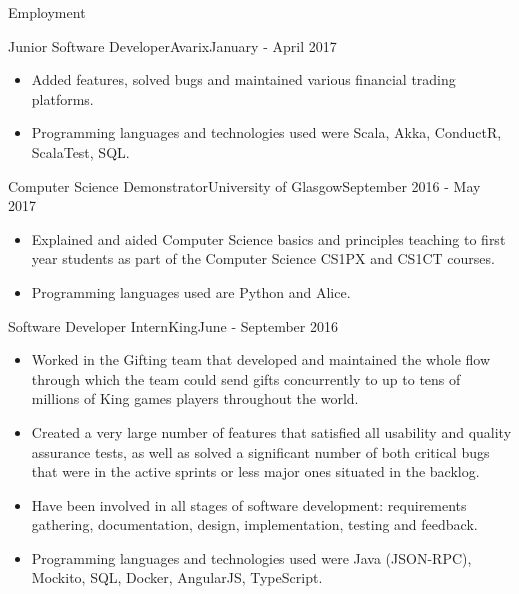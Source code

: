 \documentclass[]{cv}
\begin{document}
\begin{cvsection}{Employment}
		\begin{cvsubsection}{Junior Software Developer}{Avarix}{January - April 2017}
			\begin{itemize}
				\item Added features, solved bugs and maintained various financial trading platforms.
				\item Programming languages and technologies used were Scala, Akka, ConductR, ScalaTest, SQL.
			\end{itemize}
		\end{cvsubsection}

		\begin{cvsubsection}{Computer Science Demonstrator}{University of Glasgow}{September 2016 - May 2017}
			\begin{itemize}
				\item Explained and aided Computer Science basics and principles teaching to first year students as part of the Computer Science CS1PX and CS1CT courses.
				\item Programming languages used are Python and Alice.
			\end{itemize}
		\end{cvsubsection}

		\begin{cvsubsection}{Software Developer Intern}{King}{June - September 2016}
			\begin{itemize}
				\item Worked in the Gifting team that developed and maintained the whole flow through which the team could send gifts concurrently to up to tens of 
					millions of King games players throughout the world.
				\item Created a very large number of features that satisfied all usability and quality assurance tests, as well as solved a significant number of 
					both critical bugs that were in the active sprints or less major ones situated in the backlog.
				\item Have been involved in all stages of software development: requirements gathering, documentation, design, implementation, testing and feedback.
				\item Programming languages and technologies used were Java (JSON-RPC), Mockito, SQL, Docker, AngularJS, TypeScript.
			\end{itemize}
		\end{cvsubsection}


\end{cvsection}
\end{document}
